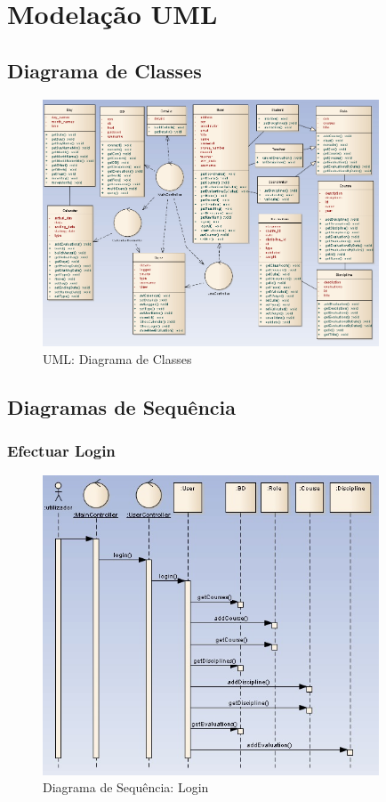 \chapter{Modelação UML}

\section{Diagrama de Classes}
\begin{figure}[!htbp]
\centering
\includegraphics[width=10cm]{imagens/diagrama_de_classes.jpg}
\caption{UML: Diagrama de Classes}
\label{fig:diagrama_de_classes}
\end{figure}

\section{Diagramas de Sequência}

\subsection{Efectuar Login}

\begin{figure}[!htbp]
\centering
\includegraphics[width=10cm]{imagens/login.jpg}
\caption{Diagrama de Sequência: Login}
\label{fig:login}
\end{figure}

